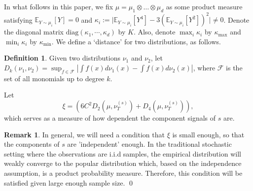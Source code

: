 \documentclass[twoside]{article}
\newcommand{\E}{\mathbb{E}}
\theoremstyle{definition}
\newtheorem{definition}[lemma]{Definition}
\newtheorem{remark}[lemma]{Remark}
\begin{document}
In what follows in this paper, we fix $\mu = \mu_1\otimes \ldots \otimes \mu_d$ as some product measure
satisfying $\E_{Y\sim\mu_i}[Y]=0$ and $\kappa_i := \vert \E_{Y\sim \mu_i}[Y^4] - 3\left(\E_{Y\sim \mu_i}[Y^2]\right)^2 \vert \neq 0$.
Denote the diagonal matrix $\text{diag}(\kappa_1,\cdots,\kappa_d)$ by $K$. 
Also, denote $\max_{i} \kappa_i$ by $\kappa_{\max}$ and $\min_{i} \kappa_i$ by $\kappa_{\min}$.
We define a `distance' for two distributions, as follows. 
\begin{definition}
Given two distributions $\nu_1$ and $\nu_2$, let $D_k(\nu_1,\nu_2) = \sup_{f\in\mathcal{F}} |\int f(x)d\nu_1(x) - \int f(x)d\nu_2(x)|$, where $\mathcal{F}$ is the set of all monomials up to degree $k$.
\end{definition} 
Let 
\begin{equation}
\label{eq:xi}
\xi = \left( 6C^2D_2(\mu, \nu_T^{(s)}) + D_4(\mu, \nu_T^{(s)})\right),
\end{equation}
which serves as a measure of how dependent the  component signals of $s$ are.

\begin{remark}
\label{rmk:xi}
In general, we will need a condition that $\xi$ is small enough, so that the components of $s$ are 'independent' enough.
In the traditional stochastic setting where the observations are i.i.d samples, the empirical distribution will weakly converge to the popular distribution which, based on the independence assumption, is a product probability measure. 
Therefore, this condition will be satisfied given large enough sample size. \qed
\end{remark} 
\end{document}
